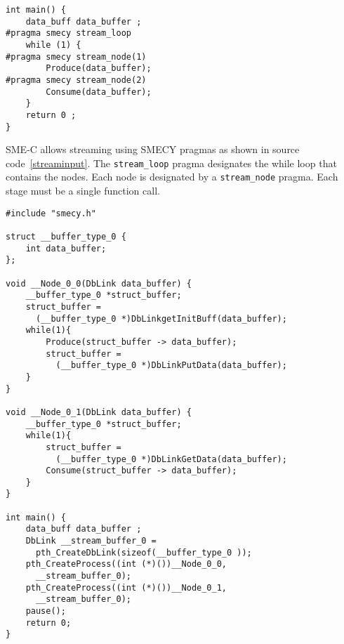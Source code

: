 \documentclass[a4paper]{article}
\begin{document}
	\begin{lstlisting}[label=streaminput,caption={Input code with
streaming pragmas. The definitions of \texttt{Produce} and \texttt{Consume} functions are not shown.}]
int main() {
	data_buff data_buffer ;
#pragma smecy stream_loop
	while (1) {
#pragma smecy stream_node(1)
		Produce(data_buffer);
#pragma smecy stream_node(2)
		Consume(data_buffer);
	}
	return 0 ;
}
	\end{lstlisting}
	
	SME-C allows streaming using SMECY pragmas as shown in source code~\ref{streaminput}. The \verb+stream_loop+ pragma designates the while loop that contains the nodes. Each node is designated by a \verb+stream_node+ pragma. Each stage must be a single function call.

	\begin{lstlisting}[label=streamoutput,caption={Possible output
code. The definitions of \texttt{Produce} and \texttt{Consume} functions are not shown.}]
#include "smecy.h" 

struct __buffer_type_0 {
	int data_buffer;
};

void __Node_0_0(DbLink data_buffer) {
	__buffer_type_0 *struct_buffer;
	struct_buffer =
	  (__buffer_type_0 *)DbLinkgetInitBuff(data_buffer);
	while(1){
		Produce(struct_buffer -> data_buffer);
		struct_buffer = 
		  (__buffer_type_0 *)DbLinkPutData(data_buffer);
	}
}

void __Node_0_1(DbLink data_buffer) {
	__buffer_type_0 *struct_buffer;
	while(1){
		struct_buffer = 
		  (__buffer_type_0 *)DbLinkGetData(data_buffer);
		Consume(struct_buffer -> data_buffer);
	}
}

int main() {
	data_buff data_buffer ;
	DbLink __stream_buffer_0 = 
	  pth_CreateDbLink(sizeof(__buffer_type_0 ));
	pth_CreateProcess((int (*)())__Node_0_0,
	  __stream_buffer_0);
	pth_CreateProcess((int (*)())__Node_0_1,
	  __stream_buffer_0);
	pause();
	return 0;
}
	\end{lstlisting}
	
\end{document}
